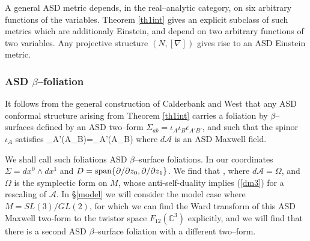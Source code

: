 A general ASD metric depends, in the real--analytic category, on six arbitrary functions of the variables. Theorem \ref{th1int} gives an explicit subclass of such metrics which are additionaly Einstein, and depend on two arbitrary functions of two variables. Any projective structure $(N, [\nabla])$ gives rise to an ASD Einstein metric.


\subsubsection{ASD $\beta$--foliation}
It follows from the general construction of Calderbank \cite{Cal1}
and West \cite{West}
that any ASD conformal structure arising from Theorem \ref{th1int} 
carries a foliation by $\beta$--surfaces defined by an ASD two--form
$\Sigma_{ab}=\iota_A\iota_B\epsilon_{A'B'}$, and  such that
the spinor $\iota_A$ satisfies
\be
\label{dm3}
\nabla_{A'(A}\iota_{B)}=_{A'(A}\iota_{B)}
\ee
where $d\mathcal{A}$ is an ASD Maxwell field.

We shall call such foliations ASD $\beta$--surface foliations. In our coordinates $\Sigma=dx^0\wedge dx^1$ and ${D}=\mathrm{span}\{\partial/\partial z_0,\partial/\partial z_1\}$. We find that
\be
\label{beta_eq}
\nabla{}\otimes \Sigma,
\ee
where $d\mathcal{A}=\Omega$, and $\Omega$ is the symplectic form on $M$, whose anti-self-duality implies (\ref{dm3}) for a rescaling of $\mathcal{A}$. In \S\ref{model} we will consider the model case where $M=SL(3)/GL(2)$, for which we can find the Ward transform of this ASD Maxwell two-form to the twistor space $F_{12}(\mathbb{C}^3)$
explicitly, and we will find that there is a second ASD $\beta$--surface foliation with a different two--form.


